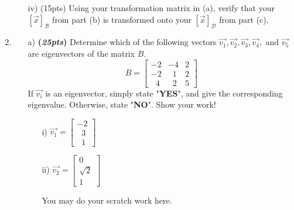 \documentclass[12pt]{article}%
\begin{document}
\begin{enumerate}
\begin{itemize}
            \vspace{5cm}
            
            \item[iv)] (15pts) Using your transformation matrix in (a), verify that your \([\vec{x}]_{\mathcal{B}}\) from part (b) is transformed onto your \([\vec{x}]_{\mathcal{D}}\) from part (c).

            \vspace{5cm}
        \end{itemize}
        

    \item 
    \begin{itemize}
         
    \item[a)] \textbf{(\emph{25pts})} Determine which of the following vectors \(\vec{v_1}, \vec{v_2}, \vec{v_3}, \vec{v_4},\text{ and } \vec{v_5}\) are eigenvectors of the matrix \(B\).
        \[B = \begin{bmatrix} -2 & -4 & 2 \\ -2 & \;\;1 & 2 \\\;\; 4 & \;\;2 & 5 \end{bmatrix}\]
    If \(\vec{v_i}\) is an eigenvector, simply state "\textbf{YES}", and give the corresponding eigenvalue.
    Otherwise, state "\textbf{NO}". Show your work!
    \begin{itemize}
        \item[i)] \(\vec{v_1}=\begin{bmatrix}-2\\ \;\;3\\\;\;1\end{bmatrix}\)
        \vspace{3cm}
        \item [ii)] \(\vec{v_2}=\begin{bmatrix}0\\ \sqrt{2}\\1\end{bmatrix}\)
        \vspace{3cm}

        \newpage
        
            You may do your scratch work here.
        
        \newpage
            

\end{itemize}
\end{itemize}
\end{enumerate}
\end{document}
